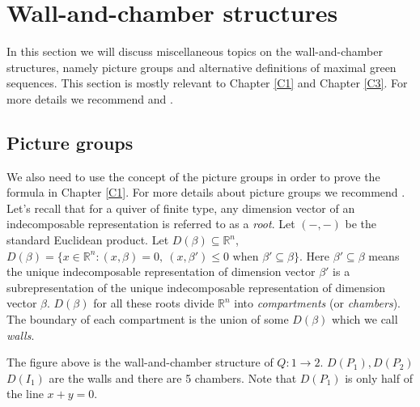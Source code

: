 \section{Wall-and-chamber structures}
\indent In this section we will discuss miscellaneous topics on the wall-and-chamber structures, namely picture groups and alternative definitions of maximal green sequences. This section is mostly relevant to Chapter \ref{C1} and Chapter \ref{C3}. For more details we recommend \cite{GHKK14}\cite{Mul15}\cite{BST17}\cite{BST18A}\cite{BST18B}\cite{IOTW15} and \cite{IT17}.\\
\subsection{Picture groups}\label{Picgr}
\indent We also need to use the concept of the picture groups in order to prove the formula in Chapter \ref{C1}. For more details about picture groups we recommend \cite{IT17}.\\
\indent Let's recall that for a quiver of finite type, any dimension vector of an indecomposable representation is referred to as a \textit{root}. Let $(-,-)$ be the standard Euclidean product. Let $D(\beta)\subseteq\mathbb{R}^n$, $D(\beta)= \{x\in\mathbb{R}^n: (x,\beta)=0,\ (x,\beta')\leq 0\text{ when }\beta'\subseteq\beta\}$. Here $\beta'\subseteq\beta$ means the unique indecomposable representation of dimension vector $\beta'$ is a subrepresentation of the unique indecomposable representation of dimension vector $\beta$. $D(\beta)$ for all these roots divide $\mathbb{R}^n$ into \textit{compartments} (or \textit{chambers}). The boundary of each compartment is the union of some $D(\beta)$ which we call \textit{walls}.\cite{IT17}\cite{IOTW4}\\
\begin{example}
\indent The figure above is the wall-and-chamber structure of $Q:1\to 2$. $D(P_1), D(P_2)$\\$D(I_1)$ are the walls and there are 5 chambers. Note that $D(P_1)$ is only half of the line $x + y = 0$.
\end{example}
